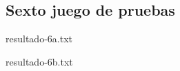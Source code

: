 
\subsection{Sexto juego de pruebas} \label{sec:prueba-6}


%
    {resultado-6a.txt}


%
    {resultado-6b.txt}




